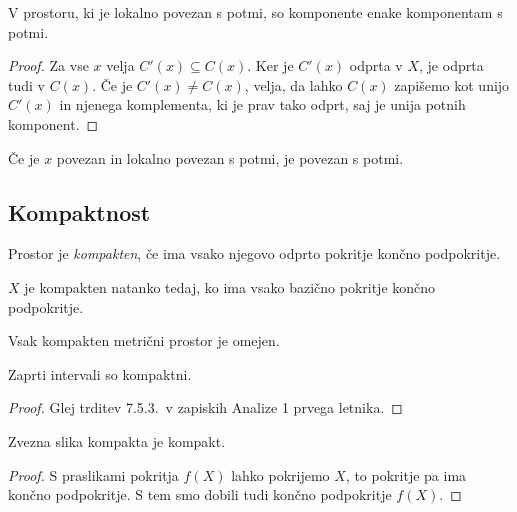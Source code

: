 \begin{izrek}
V prostoru, ki je lokalno povezan s potmi, so komponente enake
komponentam s potmi.
\end{izrek}

\begin{proof}
Za vse $x$ velja $C'(x) \subseteq C(x)$. Ker je $C'(x)$ odprta v
$X$, je odprta tudi v $C(x)$. Če je $C'(x) \ne C(x)$, velja, da
lahko $C(x)$ zapišemo kot unijo $C'(x)$ in njenega komplementa, ki
je prav tako odprt, saj je unija potnih komponent.
\end{proof}

\begin{posledica}
Če je $x$ povezan in lokalno povezan s potmi, je povezan s potmi.
\end{posledica}

\newpage

\subsection{Kompaktnost}

\begin{okvir}
\begin{definicija}
Prostor je \emph{kompakten},
če ima vsako njegovo odprto pokritje končno podpokritje.
\end{definicija}
\end{okvir}

\begin{trditev}
$X$ je kompakten natanko tedaj, ko ima vsako bazično pokritje
končno podpokritje.
\end{trditev}

\obvs

\begin{izrek}
Vsak kompakten metrični prostor je omejen.
\end{izrek}

\obvs

\begin{izrek}
Zaprti intervali so kompaktni.
\end{izrek}

\begin{proof}
Glej trditev 7.5.3.\ v zapiskih Analize 1 prvega letnika.
\end{proof}

\begin{izrek}
Zvezna slika kompakta je kompakt.
\end{izrek}

\begin{proof}
S praslikami pokritja $f(X)$ lahko pokrijemo $X$, to pokritje pa
ima končno podpokritje. S tem smo dobili tudi končno podpokritje
$f(X)$.
\end{proof}

